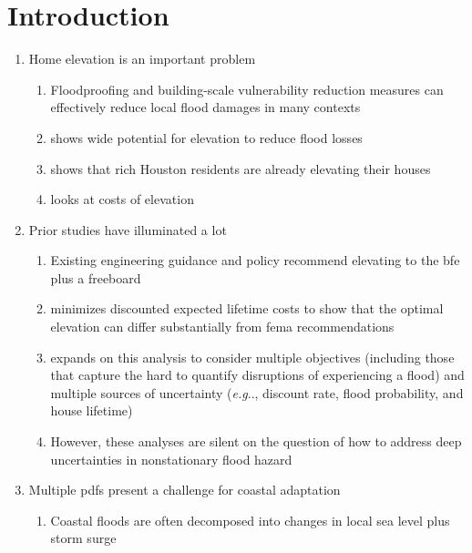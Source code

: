\documentclass[12pt]{article}
\makeatletter
\DeclareRobustCommand\onedot{\futurelet\@let@token\@onedot}
\def\@onedot{\ifx\@let@token.\else.\null\fi\xspace}
\def\eg{\emph{e.g}\onedot} \def\Eg{\emph{E.g}\onedot}
\makeatother
\begin{document}
\clearpage
\section{Introduction}
\begin{enumerate}
    \item Home elevation is an important problem
          \begin{enumerate}
              \item Floodproofing and building-scale vulnerability reduction measures can effectively reduce local flood damages in many contexts \citep{demoel_reducing:2014,deruig_building:2020,kreibich_building:2005,slotter_floodproofing:2020,Rozer:2016dn}
              \item \citet{mobley_mitigation:2020} shows wide potential for elevation to reduce flood losses
              \item \citet{cardenas_elevation:2018} shows that rich Houston residents are already elevating their houses
              \item \citet{aerts_cost:2018} looks at costs of elevation
          \end{enumerate}
    \item Prior studies have illuminated a lot
          \begin{enumerate}
              \item Existing engineering guidance and policy recommend elevating to the \gls{bfe} plus a freeboard \citep{fema_retrofitting:2014,asce_24-14:2015,fema_retrofitting:2014}
              \item \citet{xian_elevation:2017} minimizes discounted expected lifetime costs to show that the optimal elevation can differ substantially from \gls{fema} recommendations
              \item \citet{zarekarizi_suboptimal:2020} expands on this analysis to consider multiple objectives (including those that capture the hard to quantify disruptions of experiencing a flood) and multiple sources of uncertainty (\eg, discount rate, flood probability, and house lifetime)
              \item However, these analyses are silent on the question of how to address deep uncertainties in nonstationary flood hazard
          \end{enumerate}
    \item Multiple \glspl{pdf} present a challenge for coastal adaptation
          \begin{enumerate}
              \item Coastal floods are often decomposed into changes in local sea level \citep{kopp_evolving:2017,kopp_probabilistic:2014,wong_brick0.2:2017} plus storm surge \citep{garner_slrise:2018,cagigal_emulator:2020,rueda_surge:2016}

\end{enumerate}
\end{enumerate}
\end{document}

